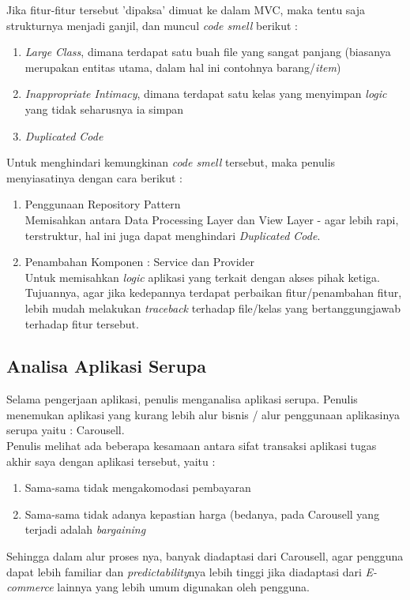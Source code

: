     \indent Jika fitur-fitur tersebut 'dipaksa' dimuat ke dalam MVC, maka tentu saja strukturnya menjadi ganjil, dan muncul \textit{code smell} berikut :
    \begin{enumerate}
    \item \textit{Large Class}, dimana terdapat satu buah file yang sangat panjang (biasanya merupakan entitas utama, dalam hal ini contohnya barang/\textit{item})
    \item \textit{Inappropriate Intimacy}, dimana terdapat satu kelas yang menyimpan \textit{logic} yang tidak seharusnya ia simpan
    \item \textit{Duplicated Code}
    \end{enumerate}
    
    \indent Untuk menghindari kemungkinan \textit{code smell} tersebut, maka penulis menyiasatinya dengan cara berikut :
    \begin{enumerate}
    \item Penggunaan Repository Pattern
    \\ Memisahkan antara Data Processing Layer dan View Layer - agar lebih rapi, terstruktur, hal ini juga dapat menghindari \textit{Duplicated Code}.
    \item Penambahan Komponen : Service dan Provider \\
    Untuk memisahkan \textit{logic} aplikasi yang terkait dengan akses pihak ketiga. Tujuannya, agar jika kedepannya terdapat perbaikan fitur/penambahan fitur, lebih mudah melakukan \textit{traceback} terhadap file/kelas yang bertanggungjawab terhadap fitur tersebut.
	\end{enumerate}
    
    \subsection{Analisa Aplikasi Serupa}
    \label{alasan-app-serupa}
    Selama pengerjaan aplikasi, penulis menganalisa aplikasi serupa. Penulis menemukan aplikasi yang kurang lebih alur bisnis / alur penggunaan aplikasinya serupa yaitu : Carousell. \\
	\indent Penulis melihat ada beberapa kesamaan antara sifat transaksi aplikasi tugas akhir saya dengan aplikasi tersebut, yaitu :
	\begin{enumerate}
	\item Sama-sama tidak mengakomodasi pembayaran
    \item Sama-sama tidak adanya kepastian harga (bedanya, pada Carousell yang terjadi adalah \textit{bargaining}
	\end{enumerate}
	\indent Sehingga dalam alur proses nya, banyak diadaptasi dari Carousell, agar pengguna dapat lebih familiar dan \textit{predictability}nya lebih tinggi jika diadaptasi dari \textit{E-commerce} lainnya yang lebih umum digunakan oleh pengguna.